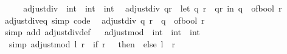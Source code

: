 \begin{isabellebody}
\isanewline
{}\isanewline
\ \ \isanewline
{}\ \isamarkupfalse%
\ adjust{\isacharunderscore}{\kern0pt}div\ {\isacharcolon}{\kern0pt}{\isacharcolon}{\kern0pt}\ {\isachardoublequoteopen}int\ {\isasymtimes}\ int\ {\isasymRightarrow}\ int{\isachardoublequoteclose}\isanewline
{}\isanewline
\ \ {\isachardoublequoteopen}adjust{\isacharunderscore}{\kern0pt}div\ qr\ {\isacharequal}{\kern0pt}\ {\isacharparenleft}{\kern0pt}let\ {\isacharparenleft}{\kern0pt}q{\isacharcomma}{\kern0pt}\ r{\isacharparenright}{\kern0pt}\ {\isacharequal}{\kern0pt}\ qr\ in\ q\ {\isacharplus}{\kern0pt}\ of{\isacharunderscore}{\kern0pt}bool\ {\isacharparenleft}{\kern0pt}r\ {\isasymnoteq}\ {}{\isacharparenright}{\kern0pt}{\isacharparenright}{\kern0pt}{\isachardoublequoteclose}\isanewline
\isanewline
{}\ \isamarkupfalse%
\ adjust{\isacharunderscore}{\kern0pt}div{\isacharunderscore}{\kern0pt}eq\ {\isacharbrackleft}{\kern0pt}simp{\isacharcomma}{\kern0pt}\ code{\isacharbrackright}{\kern0pt}{\isacharcolon}{\kern0pt}\isanewline
\ \ {\isachardoublequoteopen}adjust{\isacharunderscore}{\kern0pt}div\ {\isacharparenleft}{\kern0pt}q{\isacharcomma}{\kern0pt}\ r{\isacharparenright}{\kern0pt}\ {\isacharequal}{\kern0pt}\ q\ {\isacharplus}{\kern0pt}\ of{\isacharunderscore}{\kern0pt}bool\ {\isacharparenleft}{\kern0pt}r\ {\isasymnoteq}\ {}{\isacharparenright}{\kern0pt}{\isachardoublequoteclose}\isanewline
%
\isadelimproof
\ \ %
\endisadelimproof
%
\isatagproof
{}\isamarkupfalse%
\ {\isacharparenleft}{\kern0pt}simp\ add{\isacharcolon}{\kern0pt}\ adjust{\isacharunderscore}{\kern0pt}div{\isacharunderscore}{\kern0pt}def{\isacharparenright}{\kern0pt}\isanewline
\isanewline
{}%
\endisatagproof
{\isafoldproof}%
%
\isadelimproof
%
\endisadelimproof
\ \isamarkupfalse%
\ adjust{\isacharunderscore}{\kern0pt}mod\ {\isacharcolon}{\kern0pt}{\isacharcolon}{\kern0pt}\ {\isachardoublequoteopen}int\ {\isasymRightarrow}\ int\ {\isasymRightarrow}\ int{\isachardoublequoteclose}\isanewline
{}\isanewline
\ \ {\isacharbrackleft}{\kern0pt}simp{\isacharbrackright}{\kern0pt}{\isacharcolon}{\kern0pt}\ {\isachardoublequoteopen}adjust{\isacharunderscore}{\kern0pt}mod\ l\ r\ {\isacharequal}{\kern0pt}\ {\isacharparenleft}{\kern0pt}if\ r\ {\isacharequal}{\kern0pt}\ {}\ then\ {}\ else\ l\ {\isacharminus}{\kern0pt}\ r{\isacharparenright}{\kern0pt}{\isachardoublequoteclose}\isanewline
\isanewline
{}\isamarkupfalse%

\end{isabellebody}
